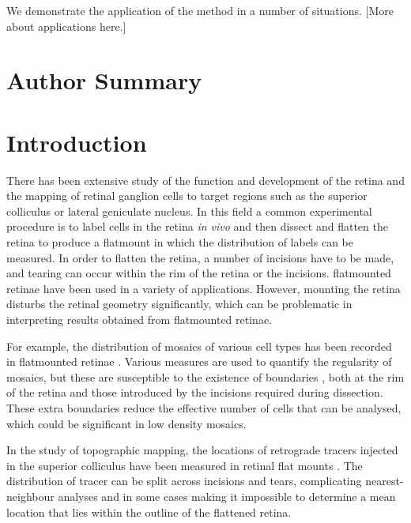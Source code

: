 \documentclass[10pt]{article}
\newcommand{\todo}[1]{{\color{red}[#1]}}
\begin{document}
We demonstrate the application of the method in a number of
situations. \todo{More about applications here.}

\section*{Author Summary}

\section*{Introduction}

There has been extensive study of the function and development of the
retina and the mapping of retinal ganglion cells to target regions
such as the superior colliculus or lateral geniculate nucleus. In this
field a common experimental procedure is to label cells in the retina
\emph{in vivo} and then dissect and flatten the retina to produce a
flatmount in which the distribution of labels can be measured. In
order to flatten the retina, a number of incisions have to be made,
and tearing can occur within the rim of the retina or the incisions.
flatmounted retinae have been used in a variety of
applications. However, mounting the retina disturbs the retinal
geometry significantly, which can be problematic in interpreting
results obtained from flatmounted retinae.

For example, the distribution of mosaics of various cell types has
been recorded in flatmounted retinae
\cite{WassBoyc91func,RaveEtal03dete}.  Various measures are used to
quantify the regularity of mosaics, but these are susceptible to the
existence of boundaries \cite{Cook96spat}, both at the rim of the
retina and those introduced by the incisions required during
dissection. These extra boundaries reduce the effective number of
cells that can be analysed, which could be significant in low density
mosaics.

In the study of topographic mapping, the locations of retrograde
tracers injected in the superior colliculus have been measured in
retinal flat mounts \cite{RebeEtal04rela,RashEtal05oppo}. The
distribution of tracer can be split across incisions and tears,
complicating nearest-neighbour analyses and in some cases making it
impossible to determine a mean location that lies within the outline
of the flattened retina.
\end{document}
